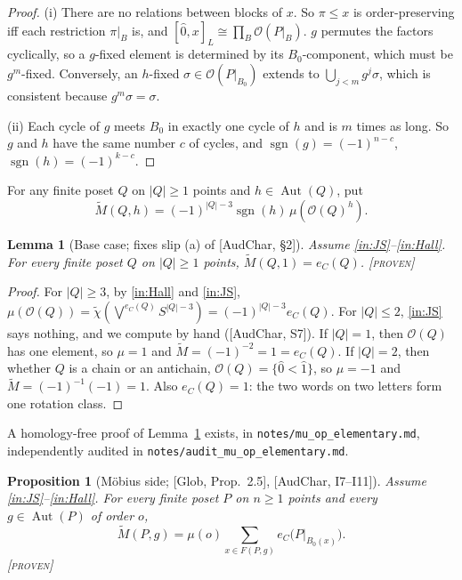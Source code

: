\documentclass[11pt]{article}
\newtheorem{proposition}[theorem]{Proposition}
\newtheorem{lemma}[theorem]{Lemma}
\theoremstyle{definition}
\theoremstyle{remark}
\newcommand{\OP}{\mathcal O}
\newcommand{\Aut}{\operatorname{Aut}}
\newcommand{\sgn}{\operatorname{sgn}}
\newcommand{\st}[1]{\textup{[\textsc{#1}]}}
\newcommand{\src}[1]{\nolinkurl{#1}}
\begin{document}
\begin{proof}
(i) There are no relations between blocks of $x$. So $\pi\le x$ is
order-preserving iff each restriction $\pi|_B$ is, and
$[\hat0,x]_L\cong\prod_B\OP(P|_B)$. $g$ permutes the factors cyclically, so a
$g$-fixed element is determined by its $B_0$-component, which must be
$g^m$-fixed. Conversely, an $h$-fixed $\sigma\in\OP(P|_{B_0})$ extends to
$\bigcup_{j<m}g^j\sigma$, which is consistent because $g^m\sigma=\sigma$.

(ii) Each cycle of $g$ meets $B_0$ in exactly one cycle of $h$ and is $m$
times as long. So $g$ and $h$ have the same number $c$ of cycles, and
$\sgn(g)=(-1)^{n-c}$, $\sgn(h)=(-1)^{k-c}$.
\end{proof}

For any finite poset $Q$ on $|Q|\ge1$ points and $h\in\Aut(Q)$, put
\[
\widetilde M(Q,h)=(-1)^{|Q|-3}\sgn(h)\,\mu(\OP(Q)^h).
\]

\begin{lemma}[Base case; fixes slip (a) of {[AudChar, \S2]}]\label{lem:small}
Assume \ref{in:JS}--\ref{in:Hall}. For every finite poset $Q$ on $|Q|\ge1$ points,
$\widetilde M(Q,1)=e_C(Q)$. \st{proven}
\end{lemma}

\begin{proof}
For $|Q|\ge3$, by \ref{in:Hall} and \ref{in:JS},
$\mu(\OP(Q))=\widetilde\chi(\bigvee^{e_C(Q)}S^{|Q|-3})=(-1)^{|Q|-3}e_C(Q)$.
For $|Q|\le2$, \ref{in:JS} says nothing, and we compute by hand
([AudChar, S7]). If $|Q|=1$, then $\OP(Q)$ has one element, so $\mu=1$ and
$\widetilde M=(-1)^{-2}=1=e_C(Q)$. If $|Q|=2$, then whether $Q$ is a chain or
an antichain, $\OP(Q)=\{\hat0<\hat1\}$, so $\mu=-1$ and
$\widetilde M=(-1)^{-1}(-1)=1$. Also $e_C(Q)=1$: the two words on two letters
form one rotation class.
\end{proof}

A homology-free proof of Lemma~\ref{lem:small} exists, in
\src{notes/mu_op_elementary.md}, independently audited in
\src{notes/audit_mu_op_elementary.md}.

\begin{proposition}[M\"obius side; {[Glob, Prop.~2.5]}, {[AudChar, I7--I11]}]
\label{prop:Mside}
Assume \ref{in:JS}--\ref{in:Hall}. For every finite poset $P$ on $n\ge1$ points and every
$g\in\Aut(P)$ of order $o$,
\[
\widetilde M(P,g)=\mu(o)\sum_{x\in F(P,g)}e_C\bigl(P|_{B_0(x)}\bigr).
\]
\st{proven}
\end{proposition}
\end{document}
